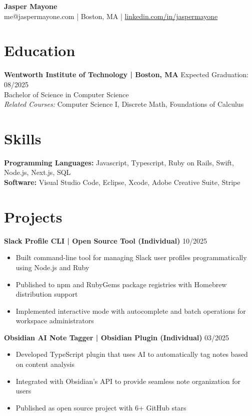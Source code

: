 \documentclass[10pt,letterpaper]{article}
\begin{document}
\begin{center}
    {\LARGE \textbf{Jasper Mayone}} \\[2pt]
    me@jaspermayone.com | Boston, MA | \href{https://linkedin.com/in/jaspermayone}{linkedin.com/in/jaspermayone}
\end{center}

\vspace{-2pt}

\section{Education}
\noindent
\textbf{Wentworth Institute of Technology | Boston, MA} \hfill Expected Graduation: 08/2025 \\
Bachelor of Science in Computer Science \\
\textit{Related Courses:} Computer Science I, Discrete Math, Foundations of Calculus

\vspace{2pt}

\section{Skills}
\noindent
\textbf{Programming Languages:} Javascript, Typescript, Ruby on Rails, Swift, Node.js, Next.js, SQL \\
\textbf{Software:} Visual Studio Code, Eclipse, Xcode, Adobe Creative Suite, Stripe

\vspace{2pt}

\section{Projects}
\noindent
\textbf{Slack Profile CLI | Open Source Tool (Individual)} \hfill 10/2025
\begin{itemize}
    \item Built command-line tool for managing Slack user profiles programmatically using Node.js and Ruby
    \item Published to npm and RubyGems package registries with Homebrew distribution support
    \item Implemented interactive mode with autocomplete and batch operations for workspace administrators
\end{itemize}

\vspace{4pt}
\noindent
\textbf{Obsidian AI Note Tagger | Obsidian Plugin (Individual)} \hfill 03/2025
\begin{itemize}
    \item Developed TypeScript plugin that uses AI to automatically tag notes based on content analysis
    \item Integrated with Obsidian's API to provide seamless note organization for users
    \item Published as open source project with 6+ GitHub stars
\end{itemize}
\end{document}

